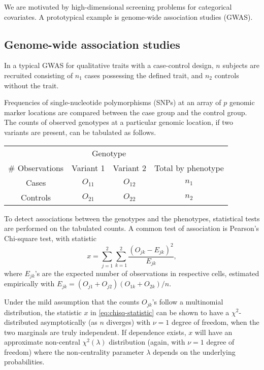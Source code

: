 
We are motivated by high-dimensional screening problems for categorical covariates.
A prototypical example is genome-wide association studies (GWAS).

\subsection{Genome-wide association studies}
\label{subsec:motivation-chisq}

In a typical GWAS for qualitative traits with a case-control design, $n$ subjects are recruited consisting of $n_1$ cases possessing the defined trait, and $n_2$ controls without the trait.

Frequencies of single-nucleotide polymorphisms (SNPs) at an array of $p$ genomic marker locations are compared between the case group and the control group.
The counts of observed genotypes at a particular genomic location, if two variants are present, can be tabulated as follows.
\begin{center}
    \begin{tabular}{cccc}
    \hline
    & \multicolumn{2}{c}{Genotype} & \\
    \cline{2-3}
    \# Observations & Variant 1 & Variant 2 & Total by phenotype \\
    \hline
    Cases & $O_{11}$ & $O_{12}$ & $n_1$ \\
    Controls & $O_{21}$ & $O_{22}$ & $n_2$ \\
    \hline
    \end{tabular}
\end{center}
To detect associations between the genotypes and the phenotypes, statistical tests are performed on the tabulated counts.
A common test of association is Pearson's Chi-square test, with statistic
\begin{equation} \label{eq:chisq-statistic}
    x = \sum_{j=1}^2 \sum_{k=1}^2 \frac{(O_{jk} - E_{jk})^2}{E_{jk}},
\end{equation}
where $E_{jk}$'s are the expected number of observations in respective cells, estimated empirically with $E_{jk} = (O_{j1}+O_{j2})(O_{1k}+O_{2k})/n$.

Under the mild assumption that the counts $O_{jk}$'s follow a multinomial distribution, the statistic $x$ in \eqref{eq:chisq-statistic} can be shown to have a $\chi^2$-distributed asymptotically (as $n$ diverges) with $\nu=1$ degree of freedom, when the two marginals are truly independent.
If dependence exists, $x$ will have an approximate non-central $\chi^2(\lambda)$ distribution (again, with $\nu=1$ degree of freedom) where the non-centrality parameter $\lambda$ depends on the underlying probabilities.

